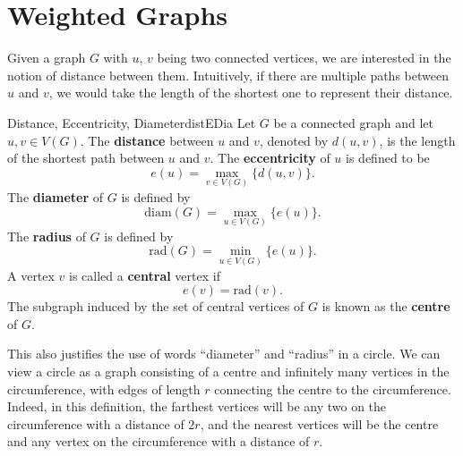 \documentclass[math]{amznotes}
\theoremstyle{remark}
\begin{document}
\section{Weighted Graphs}
Given a graph $G$ with $u$, $v$ being two connected vertices, we are interested in the notion of distance between them. Intuitively, if there are multiple paths between $u$ and $v$, we would take the length of the shortest one to represent their distance.
\begin{dfnbox}{Distance, Eccentricity, Diameter}{distEDia}
    Let $G$ be a connected graph and let $u, v \in V(G)$. The {\color{red} \textbf{distance}} between $u$ and $v$, denoted by $d(u, v)$, is the length of the shortest path between $u$ and $v$. The {\color{red} \textbf{eccentricity}} of $u$ is defined to be
    \begin{equation*}
        e(u) = \max_{v \in V(G)}\{d(u, v)\}.
    \end{equation*}
    The {\color{red} \textbf{diameter}} of $G$ is defined by
    \begin{equation*}
        \mathrm{diam}(G) = \max_{u \in V(G)}\{e(u)\}.
    \end{equation*}
    The {\color{red} \textbf{radius}} of $G$ is defined by
    \begin{equation*}
        \mathrm{rad}(G) = \min_{u \in V(G)}\{e(u)\}.
    \end{equation*}
    A vertex $v$ is called a {\color{red} \textbf{central}} vertex if
    \begin{equation*}
        e(v) = \mathrm{rad}(v).
    \end{equation*}
    The subgraph induced by the set of central vertices of $G$ is known as the {\color{red} \textbf{centre}} of $G$.
\end{dfnbox}
This also justifies the use of words ``diameter'' and ``radius'' in a circle. We can view a circle as a graph consisting of a centre and infinitely many vertices in the circumference, with edges of length $r$ connecting the centre to the circumference. Indeed, in this definition, the farthest vertices will be any two on the circumference with a distance of $2r$, and the nearest vertices will be the centre and any vertex on the circumference with a distance of $r$.
\end{document}
